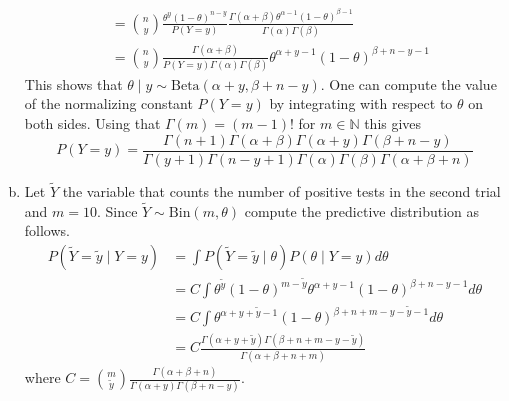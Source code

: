 \documentclass{article}
\theoremstyle{plain}
\theoremstyle{definition}
\newenvironment{sol}{\begin{trivlist}
 \item[\hskip \labelsep {\textit{Solution}.}\hskip \labelsep]}{\end{trivlist}}
\begin{document}
\begin{sol}
\begin{enumerate}[(a)]
\begin{align*}
& =\binom{n}{y}\frac{\theta^y(1-\theta)^{n-y}}{P(Y=y)}\frac{\Gamma(\alpha+\beta)\theta^{\alpha-1}(1-\theta)^{\beta-1}}{\Gamma(\alpha)\Gamma(\beta)}\\
&= \binom{n}{y}\frac{\Gamma(\alpha+\beta)}{P(Y=y)\Gamma(\alpha)\Gamma(\beta)}\theta^{\alpha+y-1}(1-\theta)^{\beta+n-y-1}
\end{align*}
This shows that $\theta\mid y\sim\mathrm{Beta}(\alpha+y, \beta+n-y)$. One can compute the value of the normalizing constant $P(Y=y)$ by integrating with respect to $\theta$ on both sides. Using that $\Gamma(m)=(m-1)!$ for $m\in\mathbb{N}$ this gives
\[
P(Y=y)= \frac{\Gamma(n+1)\Gamma(\alpha+\beta)\Gamma(\alpha+y)\Gamma(\beta +n-y)}{\Gamma(y+1)\Gamma(n-y+1)\Gamma(\alpha)\Gamma(\beta)\Gamma(\alpha+\beta+n)}
\]
\item Let $\tilde{Y}$ the variable that counts the number of positive tests in the second trial and $m=10$. Since $\tilde{Y}\sim\mathrm{Bin}(m,\theta)$ compute the predictive distribution as follows.
\begin{align*}
P(\tilde{Y}=\tilde{y}\mid Y=y)& = \int P(\tilde{Y} = \tilde{y}\mid \theta)P(\theta\mid Y = y)d\theta\\
& = C\int \theta^{\tilde{y}}(1-\theta)^{m-\tilde{y}}\theta^{\alpha+y-1}(1-\theta)^{\beta+n-y-1}d\theta\\
& = C\int \theta^{\alpha+y+\tilde{y}-1}(1-\theta)^{\beta+n+m-y-\tilde{y}-1}d\theta\\
&= C\frac{\Gamma(\alpha+y+\tilde{y})\Gamma(\beta+n+m-y-\tilde{y})}{\Gamma(\alpha+\beta+n+m)}
\end{align*}
where 
$C=\binom{m}{\tilde{y}}\frac{\Gamma(\alpha+\beta+n)}{\Gamma(\alpha+y)\Gamma(\beta+n-y)}$.
\end{enumerate}
\end{sol}
\end{document}
